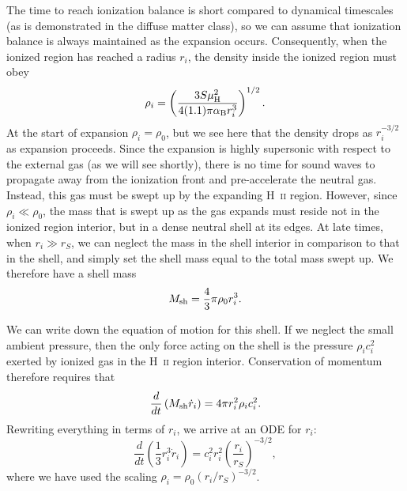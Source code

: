 The time to reach ionization balance is short compared to dynamical timescales (as is demonstrated in the diffuse matter class), so we can assume that ionization balance is always maintained as the expansion occurs. Consequently, when the ionized region has reached a radius $r_i$, the density inside the ionized region must obey
\begin{equation}
\rho_i = \left(\frac{3 S \mu_{\rm H}^2}{4(1.1)\pi \alpha_{\mathrm{B}} r_i^3}\right)^{1/2}.
\end{equation}
At the start of expansion $\rho_i = \rho_0$, but we see here that the density drops as $r_i^{-3/2}$ as expansion proceeds. Since the expansion is highly supersonic with respect to the external gas (as we will see shortly), there is no time for sound waves to propagate away from the ionization front and pre-accelerate the neutral gas. Instead, this gas must be swept up by the expanding H~\textsc{ii} region. However, since $\rho_i \ll \rho_0$, the mass that is swept up as the gas expands must reside not in the ionized region interior, but in a dense neutral shell at its edges. At late times, when $r_i \gg r_S$, we can neglect the mass in the shell interior in comparison to that in the shell, and simply set the shell mass equal to the total mass swept up. We therefore have a shell mass
\begin{equation}
M_{\rm sh} = \frac{4}{3} \pi \rho_0 r_i^3.
\end{equation}

We can write down the equation of motion for this shell. If we neglect the small ambient pressure, then the only force acting on the shell is the pressure $\rho_i c_i^2$ exerted by ionized gas in the H~\textsc{ii} region interior. Conservation of momentum therefore requires that
\begin{equation}
\frac{d}{dt} \left(M_{\rm sh} \dot{r}_i\right) = 4\pi r_i^2 \rho_i c_i^2.
\end{equation}
Rewriting everything in terms of $r_i$, we arrive at an ODE for $r_i$:
\begin{equation}
\frac{d}{dt} \left(\frac{1}{3} r_i^3 \dot{r}_i\right) = c_i^2 r_i^2 \left(\frac{r_i}{r_S}\right)^{-3/2},
\end{equation}
where we have used the scaling $\rho_i = \rho_0 (r_i/r_S)^{-3/2}$.

